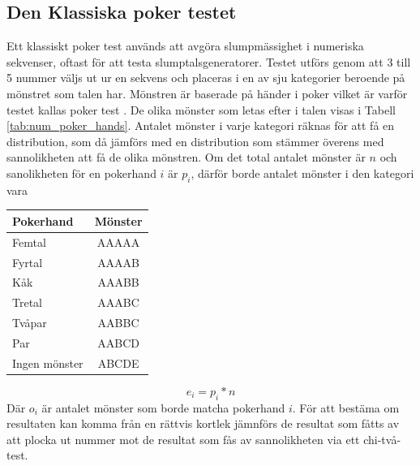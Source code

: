 \documentclass[swedish,a4paper]{article}
\begin{document}
\subsection{Den Klassiska poker testet}
\label{sec:poker_test}



\noindent
\begin{minipage}[t]{0.6\textwidth}
Ett klassiskt poker test används att avgöra slump\-mässighet i numeriska 
sekvenser, oftast för att testa slumptalsgeneratorer. Testet utförs genom
att 3 till 5 nummer väljs ut ur en sekvens och placeras i en av sju
kategorier beroende på mönstret som talen har.  Mönstren är baserade på händer i poker vilket är varför testet kallas poker test \parencite{Abdel2014}. 
De olika mönster som letas efter i talen visas i Tabell \ref{tab:num_poker_hands}.
\indent
 Antalet mönster i varje kategori räknas för att få en distribution, som
 då jämförs med en distribution som stämmer överens med sannolikheten
 att få de olika mönstren. Om det total antalet mönster är $n$ och
 sanolikheten för en pokerhand $i$ är $p_i$, därför borde antalet mönster i
 den kategori vara 
\end{minipage}%
\hfill
\begin{minipage}[t]{0.40\textwidth}
	\centering
	\captionsetup{width=0.5\textwidth}
    \label{tab:num_poker_hands}
	\begin{tabular}{|l|c|}
	\hline 
	Pokerhand & Mönster \\ \hline  
	Femtal & AAAAA \\ \hline
	Fyrtal & AAAAB \\ \hline
	Kåk & AAABB \\ \hline
	Tretal & AAABC \\ \hline
	Tvåpar & AABBC \\ \hline
	Par & AABCD \\ \hline
    	Ingen mönster & ABCDE \\ \hline
	
\end{tabular}
%
\end{minipage}
$$e_i = p_i * n$$
 Där $o_i$ är antalet mönster som
 borde matcha pokerhand $i$. För att bestäma om resultaten kan komma
 från en rättvis kortlek jämnförs de resultat som fåtts av att plocka
 ut nummer mot de resultat som fås av sannolikheten via ett chi-två-test.
\end{document}

